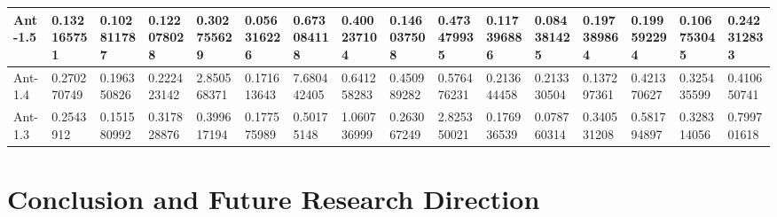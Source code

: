 \documentclass[12pt]{report}
\begin{document}
\begin{landscape}
\begin{table}[h]
\begin{tabular}{|l|l|l|l|l|l|l|l|l|l|l|l|l|l|l|l|}
Ant-1.5 &0.132165751&	0.102811787&	0.122078028
&0.302755629&	0.056316226&	0.673084118
&0.400237104&	0.146037508&	0.473479935
&0.117396886&	0.084381425&	0.197389864
&0.199592294&	0.106753045&	0.242312833\\ \hline

Ant-1.4 &0.270270749&	0.196350826&	0.222423142&
2.850568371&	0.171613643&	7.680442405&
0.641258283&	0.450989282&	0.576476231&
0.213644458&	0.213330504&	0.137297361&
0.421370627&	0.325435599&	0.410650741   \\ \hline

Ant-1.3  &0.2543912&	0.151580992&	0.317828876&
0.399617194&	0.177575989&	0.50175148&
1.060736999&	0.263067249&	2.825350021&
0.176936539&	0.078760314&	0.340531208&
0.581794897&	0.328314056&	0.799701618    \\ \hline

\end{tabular}
\end{table}
\end{landscape}



\chapter{Conclusion and Future Research Direction}


\begin{singlespace}


\end{singlespace}
\end{document}
